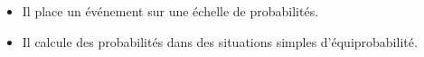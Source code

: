 \begin{prerequis}[Objectifs de 5\up{e}]  
    \begin{itemize}  
        \item Il place un événement sur une échelle de probabilités.
        \columnbreak
        \item Il calcule des probabilités dans des situations simples d'équiprobabilité.
      \end{itemize}
\end{prerequis}
